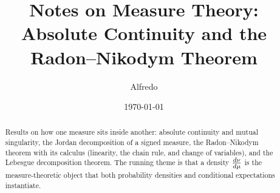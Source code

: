 \documentclass[11pt]{article}
\title{Notes on Measure Theory:\\ Absolute Continuity and the Radon--Nikodym Theorem}
\author{Alfredo}
\date{\today}
\begin{document}
\maketitle

\begin{abstract}
Results on how one measure sits inside another: absolute continuity and mutual
singularity, the Jordan decomposition of a signed measure, the Radon--Nikodym
theorem with its calculus (linearity, the chain rule, and change of variables),
and the Lebesgue decomposition theorem. The running theme is that a density
$\frac{d \nu}{d \mu}$ is the measure-theoretic object that both probability densities
and conditional expectations instantiate.
\end{abstract}

\tableofcontents
\bigskip




\end{document}
